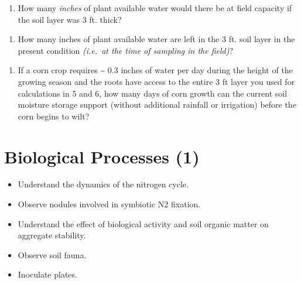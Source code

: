 \documentclass[
  letterpaper,
  twocolumn,
  portrait]{scrbook}
\providecommand{\tightlist}{%
  \setlength{\itemsep}{0pt}\setlength{\parskip}{0pt}}\usepackage{longtable,booktabs,array}
\begin{document}
\begin{enumerate}
\def\labelenumi{\arabic{enumi}.}
\setcounter{enumi}{4}
\tightlist
\item
  How many \emph{inches} of plant available water would there be at
  field capacity if the soil layer was 3 ft. thick?
\end{enumerate}

\begin{enumerate}
\def\labelenumi{\arabic{enumi}.}
\setcounter{enumi}{5}
\tightlist
\item
  How many inches of plant available water are left in the 3 ft. soil
  layer in the present condition \emph{(i.e.~at the time of sampling in
  the field)}?
\end{enumerate}

\begin{enumerate}
\def\labelenumi{\arabic{enumi}.}
\setcounter{enumi}{6}
\tightlist
\item
  If a corn crop requires \textasciitilde{} 0.3 inches of water per day
  during the height of the growing season and the roots have access to
  the entire 3 ft layer you used for calculations in 5 and 6, how many
  days of corn growth can the current soil moisture storage support
  (without additional rainfall or irrigation) before the corn begins to
  wilt?
\end{enumerate}


\hypertarget{biological-processes-1}{%
\chapter{\texorpdfstring{\textbf{Biological Processes
(1)}}{Biological Processes (1)}}\label{biological-processes-1}}

\begin{tcolorbox}[enhanced jigsaw, colframe=quarto-callout-note-color-frame, coltitle=black, arc=.35mm, breakable, bottomrule=.15mm, colback=white, rightrule=.15mm, toprule=.15mm, opacityback=0, bottomtitle=1mm, left=2mm, titlerule=0mm, leftrule=.75mm, opacitybacktitle=0.6, toptitle=1mm, title=\textcolor{quarto-callout-note-color}{\faInfo}\hspace{0.5em}{Objectives}, colbacktitle=quarto-callout-note-color!10!white]

\begin{itemize}
\tightlist
\item
  Understand the dynamics of the nitrogen cycle.
\item
  Observe nodules involved in symbiotic N2 fixation.
\item
  Understand the effect of biological activity and soil organic matter
  on aggregate stability.
\item
  Observe soil fauna.
\item
  Inoculate plates.
\end{itemize}

\end{tcolorbox}
\end{document}
